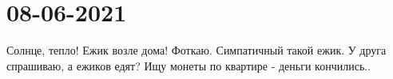  
 
 
 
 
\section{08-06-2021}

Солнце, тепло! Ежик возле дома! Фоткаю. Симпатичный такой ежик.
У друга спрашиваю, а ежиков едят? Ищу монеты по квартире - деньги кончились..
